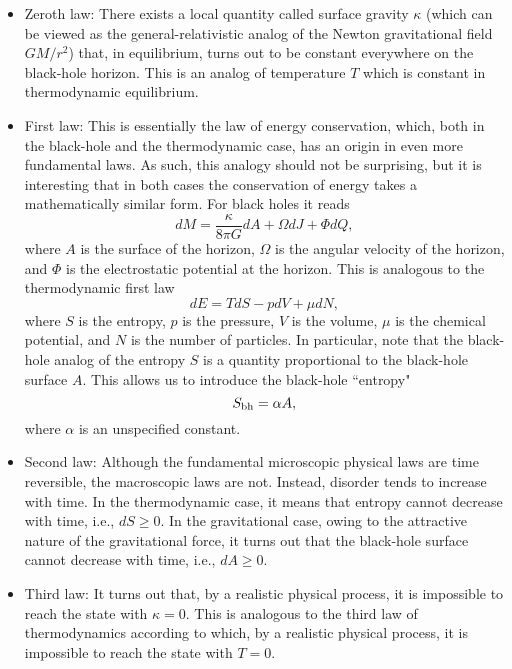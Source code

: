 \documentclass[12pt]{article}
\begin{document}
\begin{itemize}
\item
Zeroth law: There exists a local quantity called surface gravity 
$\kappa$ (which can be viewed as the general-relativistic analog 
of the Newton gravitational field $GM/r^2$)
that, in equilibrium, turns out to be constant everywhere    
on the black-hole horizon. This is an analog of temperature $T$ 
which is constant in thermodynamic equilibrium.
\item
First law: This is essentially the law of energy conservation, 
which, both in the black-hole and the thermodynamic case, has an 
origin in even more fundamental laws. As such, this analogy 
should not be surprising, but it is interesting that in both cases
the conservation of energy takes a mathematically similar form. 
For black holes it reads
\begin{equation}\label{dM}
dM=\frac{\kappa}{8\pi G}dA +\Omega dJ +\Phi dQ,
\end{equation}
where $A$ is the surface 
of the horizon, $\Omega$ is the angular velocity 
of the horizon, and $\Phi$ is the electrostatic potential
at the horizon. This is analogous to the thermodynamic first law
\begin{equation}\label{dE}
dE=TdS-pdV+\mu dN ,
\end{equation}
where $S$ is the entropy, $p$ is the pressure, $V$ is the volume,
$\mu$ is the chemical potential, and $N$ is the number of particles.
In particular, note that the black-hole analog of the entropy $S$
is a quantity proportional to the black-hole surface $A$.
This allows us to introduce the black-hole ``entropy"
\begin{equation}\label{S=A}
S_{\rm bh}=\alpha A ,
\end{equation}
where $\alpha$ is an unspecified constant.  
\item
Second law: Although the fundamental microscopic physical 
laws are time reversible, the macroscopic laws are not.
Instead, disorder tends to increase with time. In the 
thermodynamic case, it means that entropy cannot decrease with 
time, i.e., $dS\geq 0$. In the gravitational case, owing 
to the attractive nature of the gravitational force, it turns out 
that the black-hole surface cannot decrease with time, i.e., 
$dA\geq 0$.
\item
Third law: It turns out that, by a realistic 
physical process, it is impossible to reach the state with 
$\kappa=0$. This is analogous to the third law of thermodynamics 
according to which, by a realistic physical process, 
it is impossible to reach the state with $T=0$. 
\end{itemize}
\end{document}
